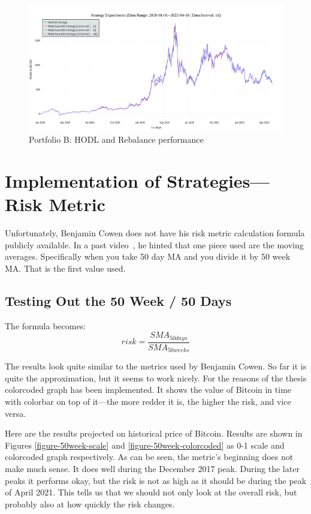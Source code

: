 \begin{figure}[!hbt]
    \centering
    \includegraphics[width=\columnwidth]{figures/benchmark-B.png}
    \caption{Portfolio B: HODL and Rebalance performance}
    \label{figure-benchmark-2}
\end{figure}

\section{Implementation of Strategies---Risk Metric}
\label{section-strategies}

Unfortunately, Benjamin Cowen does not have his risk metric calculation formula publicly available. In a past video~\cite{youtube:cowen-moving-average}, he hinted that one piece used are the moving averages. Specifically when you take 50 day MA and you divide it by 50 week MA. That is the first value used.

\subsection*{Testing Out the 50 Week / 50 Days}
\label{subsection-50week50days}
The formula becomes:
$$risk = \frac{\mathit{SMA}_{50 days}}{\mathit{SMA}_{50 weeks}}$$

The results look quite similar to the metrics used by Benjamin Cowen. So far it is quite the approximation, but it seems to work nicely. For the reasons of the thesis colorcoded graph has been implemented. It shows the value of Bitcoin in time with colorbar on top of it---the more redder it is, the higher the risk, and vice versa.

Here are the results projected on historical price of Bitcoin. Results are shown in Figures \ref{figure-50week-scale} and \ref{figure-50week-colorcoded} as 0-1 scale and colorcoded graph respectively. As can be seen, the metric's beginning does not make much sense. It does well during the December 2017 peak. During the later peaks it performs okay, but the risk is not as high as it should be during the peak of April 2021. This tells us that we should not only look at the overall risk, but probably also at how quickly the risk changes.

